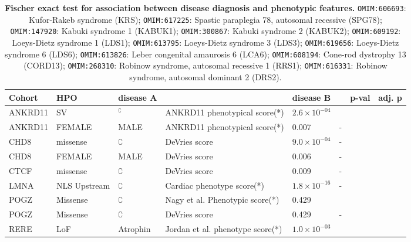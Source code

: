 \begin{table}
\centering
\begin{scriptsize}
\begin{tabular}{l>{\raggedright}p{2.5cm}llllrr}
\toprule
\textbf{Cohort} & \textbf{HPO} & \textbf{disease A} & \textbf{} & \textbf{disease B} & \textbf{} & \textbf{p-val} & \textbf{adj. p}\\
\midrule
ANKRD11 & SV & $^{\complement}$ & ANKRD11 phenotypical score(*) & $2.6 \times 10^{-04}$ & \cite{PMID_36446582}\\
ANKRD11 & FEMALE & MALE & ANKRD11 phenotypical score(*) & 0.007 & -\\
CHD8 & missense & $\complement$ & DeVries score & $9.0 \times 10^{-04}$ & -\\
CHD8 & FEMALE & MALE & DeVries score & 0.006 & -\\
CTCF & missense & $\complement$ & DeVries score & 0.009 & -\\
LMNA & NLS Upstream & $\complement$ & Cardiac phenotype score(*)& $1.8 \times 10^{-16}$ & -\\
POGZ & Missense & $\complement$ &  Nagy et al. Phenotypic  score(*)  & 0.429 & \cite{PMID_35052493}\\
POGZ & Missense & $\complement$ &  DeVries score & 0.429 & -\\
RERE & LoF & Atrophin & Jordan et al.  phenotype score(*)  & $1.0 \times 10^{-03}$ & \cite{PMID_29330883}\\
\bottomrule
\end{tabular}
\end{scriptsize}
\caption{\textbf{Fischer exact test for association between disease diagnosis and phenotypic features.}
\texttt{OMIM:606693}: Kufor-Rakeb syndrome (KRS);
 \texttt{OMIM:617225}: Spastic paraplegia 78, autosomal recessive (SPG78);
 \texttt{OMIM:147920}: Kabuki syndrome 1 (KABUK1);
 \texttt{OMIM:300867}: Kabuki syndrome 2 (KABUK2);
 \texttt{OMIM:609192}: Loeys-Dietz syndrome 1 (LDS1);
 \texttt{OMIM:613795}: Loeys-Dietz syndrome 3 (LDS3);
 \texttt{OMIM:619656}: Loeys-Dietz syndrome 6 (LDS6);
 \texttt{OMIM:613826}: Leber congenital amaurosis 6 (LCA6);
 \texttt{OMIM:608194}: Cone-rod dystrophy 13 (CORD13);
 \texttt{OMIM:268310}: Robinow syndrome, autosomal recessive 1 (RRS1);
 \texttt{OMIM:616331}: Robinow syndrome, autosomal dominant 2 (DRS2).
}
\label{tab:disease_dx}
\end{table}


\clearpage
\newpage


